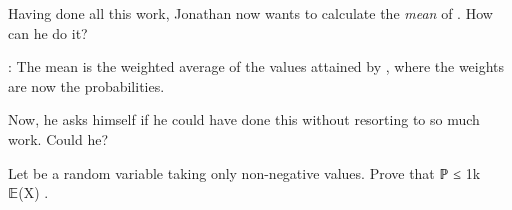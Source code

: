 			Having done all this work, Jonathan now wants to calculate the \emph{mean} of . How can he do it?

			: The mean is the weighted average of the values attained by , where the weights are now the probabilities.
			
			\blank[4*big]

			Now, he asks himself if he could have done this without resorting to so much work. Could he?
		\stopexercise

		\startexercise [title={Markov inequality}]
			Let  be a random variable taking only non-negative values. Prove that
			\startformula
				ℙ ≤ \frac1k 𝔼(X) .
			\stopformula
		\stopexercise

	\stopsection


\stopchapter